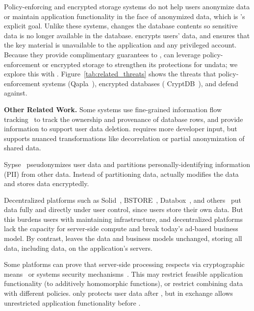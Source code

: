 Policy-enforcing and encrypted storage systems do not help users anonymize data
or maintain application functionality in the face of anonymized data, which is
\sys's explicit goal.
%
Unlike these systems, \sys changes the database contents so sensitive data is no
longer available in the database.
%
\sys encrypts users' \xxed data, and ensures that the key material is
unavailable to the application and any privileged account.
%
Because they provide complimentary guarantees to \sys, \sys can leverage
policy-enforcement or encrypted storage to strengthen its protections for
un\xxed data; we explore this with \syscrypt \newstuff{(\S\ref{s:eval-cryptdb})}.
%
Figure~\ref{tab:related_threats} shows the threats that policy-enforcement
systems (\eg Qapla~\cite{qapla}), encrypted databases (\eg
CryptDB~\cite{cryptdb}), and \sys defend against.
%

%



\textbf{Other Related Work.}
%
Some systems use fine-grained information flow tracking~\cite{schengendb} to
track the ownership and provenance of database rows, and provide information to
support user data deletion.
%
\sys requires more developer input, but supports nuanced transformations like
decorrelation or partial anonymization of shared data.
%

%
Sypse~\cite{sypse} pseudonymizes user data and partitions personally-identifying
information (PII) from other data.
%
Instead of partitioning data, \sys actually modifies the data and stores \xxed
data encryptedly.
%

%
Decentralized platforms such as Solid~\cite{solid}, BSTORE~\cite{bstore},
Databox~\cite{databox}, and others~\cite{diy, amber, oort, w5, blockstack} put
data fully and directly under user control, since users store their own data.
%
But this burdens users with maintaining infrastructure, and decentralized platforms
lack the capacity for server-side compute and break today's ad-based
business model.
%
By contrast, \sys leaves the data and business models unchanged,
storing all data, including \xxed data, on the application's servers.
%

%
Some platforms can prove that server-side processing respects
 via cryptographic means~\cite{zeph} or
systems security mechanisms~\cite{riverbed}.
%
This may restrict feasible application functionality (\eg to additively
homomorphic functions), or restrict combining data with different policies.
%
\sys only protects user data after \xxing, but in exchange allows unrestricted
application functionality before \xxing.
%

\fi
\fi
